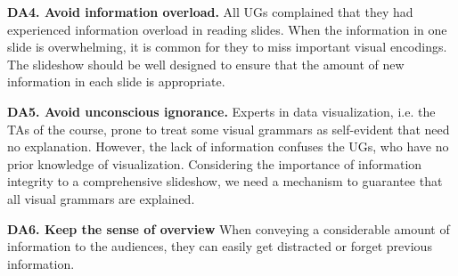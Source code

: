 \noindent
\textbf{DA4. Avoid information overload.} 
All UGs complained that they had experienced information overload in reading slides. 
When the information in one slide is overwhelming, it is common for they to miss important visual encodings. 
The slideshow should be well designed to ensure that the amount of new information in each slide is appropriate. 

\noindent
\textbf{DA5. Avoid unconscious ignorance.}
Experts in data visualization, i.e. the TAs of the course, prone to treat some visual grammars as self-evident that need no  explanation. However, the lack of information confuses the UGs, who have no prior knowledge of visualization. 
Considering the importance of information integrity to a comprehensive slideshow, we need a mechanism to guarantee that all visual grammars are explained. 

\noindent
\textbf{DA6. Keep the sense of overview}
%
When conveying a considerable amount of information to the audiences, they can easily get distracted or forget previous information. 


